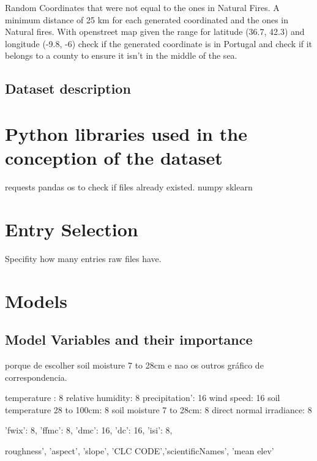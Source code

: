 Random Coordinates that were not equal to the ones in Natural Fires. A minimum distance of 25 km for each generated coordinated and the ones in Natural fires. With openstreet map given the range for latitude (36.7, 42.3) and longitude (-9.8, -6) check if the generated coordinate is in Portugal and check if it belongs to a county to ensure it isn't in the middle of the sea.

\subsection{Dataset description}







\section{Python libraries used in the conception of the dataset}
requests
pandas
os to check if files already existed.
numpy
sklearn



\section{Entry Selection}
Specifity how many entries raw files have.







\section{Models}


\subsection{Model Variables and their importance}

porque de escolher soil moisture 7 to 28cm e nao os outros gráfico de correspondencia.

temperature : 8
relative humidity: 8
precipitation': 16
wind speed: 16
soil temperature 28 to 100cm: 8
soil moisture 7 to 28cm: 8
direct normal irradiance: 8

'fwix': 8,
'ffmc': 8,
'dmc': 16,
'dc': 16,
'isi': 8,

roughness', 'aspect', 'slope', 'CLC CODE','scientificNames', 'mean elev'

